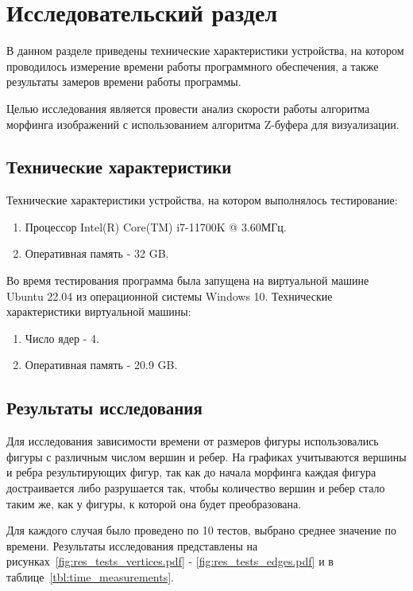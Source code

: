\chapter{Исследовательский раздел}

В данном разделе приведены технические характеристики устройства, на котором проводилось измерение времени работы программного обеспечения, а также результаты замеров времени работы программы.

Целью исследования является провести анализ скорости работы алгоритма морфинга изображений с использованием алгоритма Z-буфера для визуализации.

\section{Технические характеристики}

Технические характеристики устройства, на котором выполнялось тестирование:
\begin{enumerate}
	\item Процессор Intel(R) Core(TM) i7-11700K @ 3.60МГц.
	\item Оперативная память - 32 GB.
\end{enumerate}

Во время тестирования программа была запущена на виртуальной машине Ubuntu 22.04 из операционной системы Windows 10. 
Технические характеристики виртуальной машины:
\begin{enumerate}
	\item Число ядер - 4.
	\item Оперативная память - 20.9 GB.
\end{enumerate}

\section{Результаты исследования}

Для исследования зависимости времени от размеров фигуры использовались фигуры с различным числом вершин и ребер. 
На графиках учитываются вершины и ребра результирующих фигур, так как до начала морфинга каждая фигура достраивается либо разрушается так, чтобы количество вершин и ребер стало таким же, как у фигуры, к которой она будет преобразована.
 
Для каждого случая было проведено по 10 тестов, выбрано среднее значение по времени. 
Результаты исследования представлены на рисунках~\ref{fig:res_tests_vertices.pdf} - \ref{fig:res_tests_edges.pdf} и в таблице~\ref{tbl:time_measurements}.


